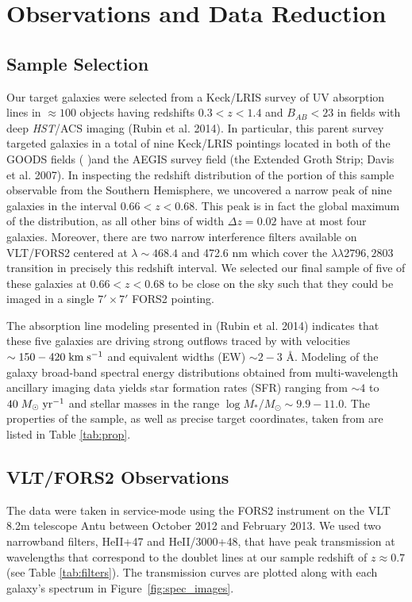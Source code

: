 \documentclass[twocolumn]{aastex61}
\def \mkms {{\rm \; km\;s^{-1}}}
\def \msunperyr {{\; M_{\odot}\rm \;yr^{-1}}}
\begin{document}
\section{Observations and Data Reduction}

\subsection{Sample Selection}
Our target galaxies were selected from a Keck/LRIS survey of UV absorption lines in $\approx 100$ objects having redshifts $0.3< z < 1.4$ and $B_{AB}< 23$ in fields with deep \emph{HST}/ACS imaging (Rubin et al. 2014)\nocite{Rubin_2014}.  In particular, this parent survey targeted galaxies in a total of nine Keck/LRIS pointings located in both of the GOODS fields (\citeauthor{Giavalisco2004} \citeyear{Giavalisco2004})and the AEGIS survey field (the Extended Groth Strip; Davis et al. 2007)\nocite{Davis2007}.  In inspecting the redshift distribution of the portion of this sample observable from the Southern Hemisphere, we uncovered a narrow peak of nine galaxies in the interval $0.66 < z < 0.68$.  This peak is in fact the global maximum of the distribution, as all other bins of width $\Delta z = 0.02$ have at most four galaxies.  Moreover, there are two narrow interference filters available on VLT/FORS2 centered at $\lambda \sim 468.4$ and 472.6 nm which cover the  $\lambda \lambda 2796, 2803$ transition in precisely this redshift interval.  We selected our final sample of five of these galaxies at $0.66 < z < 0.68$ to be close on the sky such that they could be imaged in a single $7' \times 7' $ FORS2 pointing.  

The absorption line modeling presented in (Rubin et al. 2014)\nocite{Rubin_2014} indicates that these five galaxies are driving strong outflows traced by   with velocities $\sim150-420\mkms$ and equivalent widths (EW) $\sim 2-3$ \AA.  Modeling of the galaxy broad-band spectral energy distributions obtained from multi-wavelength ancillary imaging data yields star formation rates (SFR) ranging from $\sim4$ to $40\msunperyr$ and stellar masses in the range $\log M_*/M_{\odot}\sim 9.9-11.0$. The properties of the sample, as well as precise target coordinates, taken from \cite{Rubin_2014} are listed in Table \ref{tab:prop}. 


\subsection{VLT/FORS2 Observations}
The data were taken in service-mode using the FORS2 instrument on the VLT 8.2m telescope Antu between October 2012 and February 2013. 
We used two narrowband filters, HeII+47 and HeII/3000+48, that have peak transmission at wavelengths that correspond to the  doublet lines at our sample redshift of $z\approx 0.7$ (see Table \ref{tab:filters}). The transmission curves are plotted along with each galaxy's spectrum in Figure~\ref{fig:spec_images}.
\end{document}
